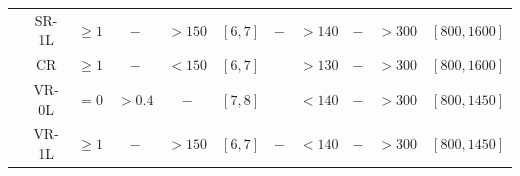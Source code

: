 \begin{landscape}
\begin{table}[t]
\begin{tabular}{c c c c c c c c c c c}
			& SR-1L 	& $\ge 1$  	& $-$		& $> 150 $ 	& $[6,7]$		& $-$ 		& $> 140$ 			& $-$ 		& $> 300 $ 				& $[800,1600]$ \\ 
			& CR 	& $\ge 1$  	& $-$ 		& $< 150$ 	& $[6,7]$		& \cmark 		& $> 130 $ 			& $-$ 		& $> 300 $ 				& $[800,1600]$ \\ 
			& VR-0L 	& $= 0$  		& $>0.4$ 		& $-$ 		& $[7,8]$		& \cmark		& $<140$ 				& $-$ 		& $> 300 $ 				& $[800,1450]$ \\
			& VR-1L 	& $\ge 1$  	& $-$ 		& $> 150$ 	& $[6,7]$		& $-$		& $<140$				& $-$ 		& $> 300 $  				& $[800,1450]$ \\
      			\bottomrule
    		\end{tabular}
 	\end{table}
\end{landscape}

\clearpage

